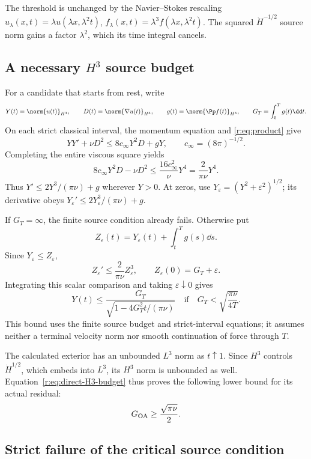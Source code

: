 The threshold is unchanged by the Navier--Stokes rescaling
\(u_\lambda(x,t)=\lambda u(\lambda x,\lambda^2t)\),
\(f_\lambda(x,t)=\lambda^3f(\lambda x,\lambda^2t)\).
The squared \(\dot H^{-1/2}\) source norm gains a factor
\(\lambda^2\), which its time integral cancels.

\subsection{A necessary \texorpdfstring{\(H^3\)}{H3} source budget}

For a candidate that starts from rest, write
\[
 Y(t)=\norm{u(t)}_{H^3},\qquad
 D(t)=\norm{\nabla u(t)}_{H^3},\qquad
 g(t)=\norm{\Pp f(t)}_{H^3},\qquad
 G_T=\int_0^Tg(t)\dd t.
\]
On each strict classical interval, the momentum equation and
\eqref{r:eq:product} give
\[
 YY'+\nu D^2\le8c_\infty Y^2D+gY,
 \qquad c_\infty=(8\pi)^{-1/2}.
\]
Completing the entire viscous square yields
\[
 8c_\infty Y^2D-\nu D^2
 \le\frac{16c_\infty^2}{\nu}Y^4
 =\frac2{\pi\nu}Y^4.
\]
Thus \(Y'\le2Y^3/(\pi\nu)+g\) wherever \(Y>0\).
At zeros, use \(Y_\varepsilon=(Y^2+\varepsilon^2)^{1/2}\);
its derivative obeys
\(Y_\varepsilon'\le2Y_\varepsilon^3/(\pi\nu)+g\).

If \(G_T=\infty\), the finite source condition already fails. Otherwise
put
\[
 Z_\varepsilon(t)=Y_\varepsilon(t)+\int_t^Tg(s)\dd s.
\]
Since \(Y_\varepsilon\le Z_\varepsilon\),
\[
 Z_\varepsilon'\le\frac2{\pi\nu}Z_\varepsilon^3,
 \qquad Z_\varepsilon(0)=G_T+\varepsilon.
\]
Integrating this scalar comparison and taking \(\varepsilon\downarrow0\)
gives
\begin{equation}
 Y(t)\le
 \frac{G_T}{\sqrt{1-4G_T^2t/(\pi\nu)}}
 \quad\text{if}\quad
 G_T<\sqrt{\frac{\pi\nu}{4T}}.
 \label{r:eq:direct-H3-budget}
\end{equation}
This bound uses the finite source budget and strict-interval equations;
it assumes neither a terminal velocity norm nor smooth continuation of
force through \(T\).

The calculated exterior has an unbounded \(L^3\) norm as \(t\uparrow1\).
Since \(H^3\) controls \(\dot H^{1/2}\), which embeds into \(L^3\),
its \(H^3\) norm is unbounded as well. Equation~\eqref{r:eq:direct-H3-budget}
thus proves the following lower bound for its actual residual:
\begin{equation}
 G_{\rm OA}\ge\frac{\sqrt{\pi\nu}}2.
 \label{r:eq:actual-H3-budget-failure}
\end{equation}

\subsection{Strict failure of the critical source condition}


